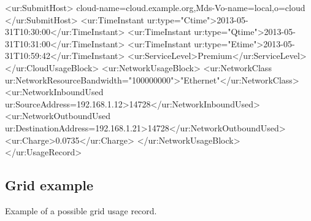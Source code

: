 \begin{XMLexample}
        <ur:SubmitHost>
            cloud-name=cloud.example.org,Mds-Vo-name=local,o=cloud
        </ur:SubmitHost>
        <ur:TimeInstant ur:type="Ctime">2013-05-31T10:30:00</ur:TimeInstant>
        <ur:TimeInstant ur:type="Qtime">2013-05-31T10:31:00</ur:TimeInstant>
        <ur:TimeInstant ur:type="Etime">2013-05-31T10:59:42</ur:TimeInstant>
        <ur:ServiceLevel>Premium</ur:ServiceLevel>
    </ur:CloudUsageBlock>
    <ur:NetworkUsageBlock>
        <ur:NetworkClass ur:NetworkResourceBandwidth="100000000">"Ethernet"</ur:NetworkClass>
        <ur:NetworkInboundUsed ur:SourceAddress=192.168.1.12>14728</ur:NetworkInboundUsed>
        <ur:NetworkOutboundUsed ur:DestinationAddress=192.168.1.21>14728</ur:NetworkOutboundUsed>
        <ur:Charge>0.0735</ur:Charge>
    </ur:NetworkUsageBlock>
</ur:UsageRecord>
\end{XMLexample}

\subsection{Grid example}
Example of a possible grid usage record.

